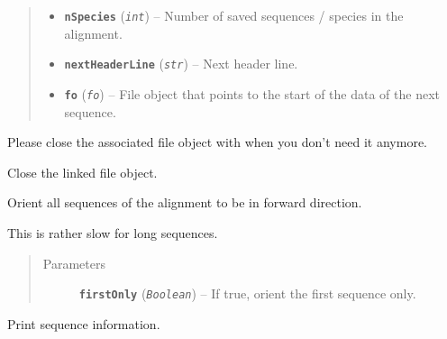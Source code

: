\documentclass[letterpaper,10pt,english]{sphinxmanual}
\begin{document}
\begin{fulllineitems}
\begin{quote}
\begin{description}
\begin{itemize}
\item {} 
\textbf{\texttt{nSpecies}} (\emph{\texttt{int}}) -- Number of saved sequences / species in the alignment.

\item {} 
\textbf{\texttt{nextHeaderLine}} (\emph{\texttt{str}}) -- Next header line.

\item {} 
\textbf{\texttt{fo}} (\emph{\texttt{fo}}) -- File object that points to the start of the data of
the next sequence.

\end{itemize}

\end{description}\end{quote}

Please close the associated file object with
{\hyperref[fasta:libPoMo.fasta.FaStream.close]{}} when you don't need it anymore.

\begin{fulllineitems}
\label{fasta:libPoMo.fasta.MFaStream.close}
Close the linked file object.

\end{fulllineitems}


\begin{fulllineitems}
\label{fasta:libPoMo.fasta.MFaStream.orient}
Orient all sequences of the alignment to be in forward direction.

This is rather slow for long sequences.
\begin{quote}\begin{description}
\item[{Parameters}] \leavevmode
\textbf{\texttt{firstOnly}} (\emph{\texttt{Boolean}}) -- If true, orient the first sequence only.

\end{description}\end{quote}

\end{fulllineitems}


\begin{fulllineitems}
\label{fasta:libPoMo.fasta.MFaStream.print_info}
Print sequence information.


\end{fulllineitems}
\end{fulllineitems}
\end{document}

